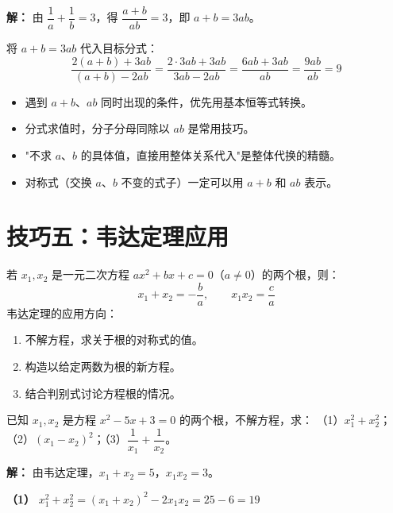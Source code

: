 \documentclass[12pt, a4paper]{ctexart}
\begin{document}
\textbf{解：} 由 $\dfrac{1}{a}+\dfrac{1}{b}=3$，得 $\dfrac{a+b}{ab}=3$，即 $a+b=3ab$。

将 $a+b=3ab$ 代入目标分式：
\[
\frac{2(a+b)+3ab}{(a+b)-2ab} = \frac{2\cdot 3ab + 3ab}{3ab - 2ab} = \frac{6ab+3ab}{ab} = \frac{9ab}{ab} = \boxed{9}
\]

\begin{tipbox}[整体代换要点总结]
\begin{itemize}[leftmargin=1.5em]
  \item 遇到 $a+b$、$ab$ 同时出现的条件，优先用基本恒等式转换。
  \item 分式求值时，分子分母同除以 $ab$ 是常用技巧。
  \item "不求 $a$、$b$ 的具体值，直接用整体关系代入"是整体代换的精髓。
  \item 对称式（交换 $a$、$b$ 不变的式子）一定可以用 $a+b$ 和 $ab$ 表示。
\end{itemize}
\end{tipbox}

\section*{\textcolor{mainblue}{技巧五：韦达定理应用}}

\begin{knowledgebox}[韦达定理]
若 $x_1, x_2$ 是一元二次方程 $ax^2+bx+c=0$（$a\neq 0$）的两个根，则：
\[
x_1 + x_2 = -\frac{b}{a}, \qquad x_1 x_2 = \frac{c}{a}
\]
韦达定理的应用方向：
\begin{enumerate}[leftmargin=2em]
  \item 不解方程，求关于根的对称式的值。
  \item 构造以给定两数为根的新方程。
  \item 结合判别式讨论方程根的情况。
\end{enumerate}
\end{knowledgebox}

\begin{examplebox}[【例10】不解方程求对称式]
已知 $x_1, x_2$ 是方程 $x^2 - 5x + 3 = 0$ 的两个根，不解方程，求：
（1）$x_1^2 + x_2^2$；\quad （2）$(x_1 - x_2)^2$；\quad （3）$\dfrac{1}{x_1} + \dfrac{1}{x_2}$。
\end{examplebox}

\textbf{解：} 由韦达定理，$x_1+x_2=5$，$x_1 x_2=3$。

\textbf{（1）} $x_1^2+x_2^2 = (x_1+x_2)^2 - 2x_1 x_2 = 25 - 6 = \boxed{19}$
\end{document}
